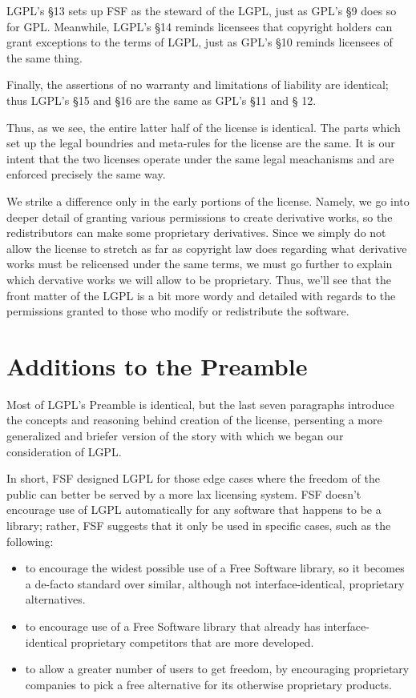 \documentclass[12pt]{report}
\begin{document}
LGPL's \S 13 sets up FSF as the steward of the LGPL, just as GPL's \S 9
does so for GPL.  Meanwhile, LGPL's \S 14 reminds licensees that copyright
holders can grant exceptions to the terms of LGPL, just as GPL's \S 10
reminds licensees of the same thing.

Finally, the assertions of no warranty and limitations of liability are
identical; thus LGPL's \S 15 and \S 16 are the same as GPL's \S 11 and \S
12.

Thus, as we see, the entire latter half of the license is identical.
The parts which set up the legal boundries and meta-rules for the license
are the same.  It is our intent that the two licenses operate under the
same legal meachanisms and are enforced precisely the same way.

We strike a difference only in the early portions of the license.
Namely, we go into deeper detail of granting various permissions to
create derivative works, so the redistributors can make some proprietary
derivatives.  Since we simply do not allow the license to stretch as far
as copyright law does regarding what derivative works must be relicensed
under the same terms, we must go further to explain which dervative works
we will allow to be proprietary.  Thus, we'll see that the front matter
of the LGPL is a bit more wordy and detailed with regards to the
permissions granted to those who modify or redistribute the software.

\section{Additions to the Preamble}

Most of LGPL's Preamble is identical, but the last seven paragraphs
introduce the concepts and reasoning behind creation of the license,
persenting a more generalized and briefer version of the story with which
we began our consideration of LGPL\@.

In short, FSF designed LGPL for those edge cases where the freedom of the
public can better be served by a more lax licensing system.  FSF doesn't
encourage use of LGPL automatically for any software that happens to be a
library; rather, FSF suggests that it only be used in specific cases, such
as the following:

\begin{itemize}

\item to encourage the widest possible use of a Free Software library, so
  it becomes a de-facto standard over similar, although not
  interface-identical, proprietary alternatives.

\item to encourage use of a Free Software library that already has
  interface-identical proprietary competitors that are more developed.

\item to allow a greater number of users to get freedom, by encouraging
  proprietary companies to pick a free alternative for its otherwise
  proprietary products.

\end{itemize}
\end{document}
